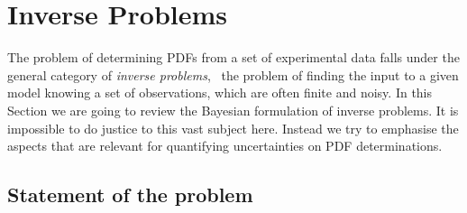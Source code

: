 
\section{Inverse Problems}
\label{sec:inverse-problems}

The problem of determining PDFs from a set of experimental data falls under the
general category of {\em inverse problems}, \ie\ the problem of finding the
input to a given model knowing a set of observations, which are often finite and
noisy. In this Section we are going to review the Bayesian formulation of
inverse problems. It is impossible to do justice to this vast subject here.
Instead we try to emphasise the aspects that are relevant for quantifying
uncertainties on PDF determinations. 

\subsection{Statement of the problem}
\label{sec:BayesianInverse}


